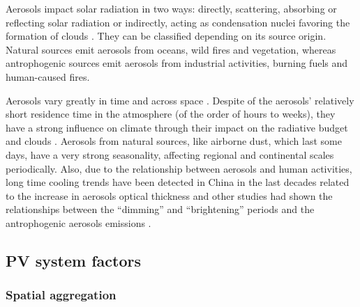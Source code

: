 Aerosols impact solar radiation in two ways: directly, scattering, absorbing or reflecting solar radiation or indirectly, acting as condensation nuclei favoring the formation of clouds \cite*{boucher2015}. They can be classified depending on its source origin. Natural sources emit aerosols from oceans, wild fires and vegetation, whereas antrophogenic sources emit aerosols from industrial activities, burning fuels and human-caused fires.


Aerosols vary greatly in time and across space \cite*{Kaufman2002}. Despite of the aerosols' relatively short residence time in the atmosphere (of the order of hours to weeks), they have a strong influence on climate through their impact on the radiative budget and clouds \cite*{Nabat2014, Nabat2015}. Aerosols from natural sources, like airborne dust, which last some days, have a very strong seasonality, affecting regional and continental scales periodically.  Also, due to the relationship between aerosols and human activities, long time cooling trends have been detected in China in the last decades related to the increase in aerosols optical thickness \cite*{Giorgi2002} and other studies had shown the relationships between the ``dimming'' and ``brightening'' periods and the antrophogenic aerosols emissions \cite*{Wild2005, Wild2012, Wild2009}. 


\subsection{PV system factors}

\subsubsection{Spatial aggregation}

